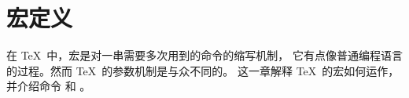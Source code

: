 \documentclass[letterpaper]{book}
\begin{document}
\chapter{宏定义}\label{macro}

在 \TeX\ 中，宏是对一串需要多次用到的命令的缩写机制，
它有点像普通编程语言的过程。然而 \TeX\ 的参数机制是与众不同的。
这一章解释 \TeX\ 的宏如何运作，并介绍命令 和 。
\end{document}
